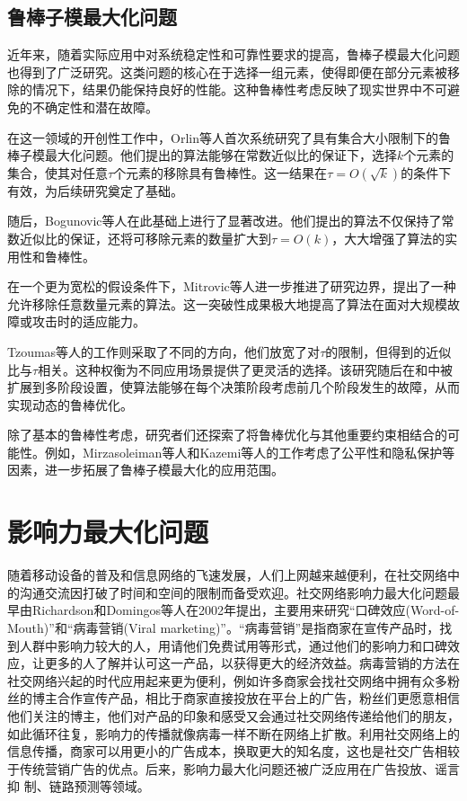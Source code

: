 \subsection{鲁棒子模最大化问题}

近年来，随着实际应用中对系统稳定性和可靠性要求的提高，鲁棒子模最大化问题也得到了广泛研究。这类问题的核心在于选择一组元素，使得即便在部分元素被移除的情况下，结果仍能保持良好的性能。这种鲁棒性考虑反映了现实世界中不可避免的不确定性和潜在故障。

在这一领域的开创性工作中，Orlin等人\cite{orlin2018robust}首次系统研究了具有集合大小限制下的鲁棒子模最大化问题。他们提出的算法能够在常数近似比的保证下，选择$k$个元素的集合，使其对任意$\tau$个元素的移除具有鲁棒性。这一结果在$\tau = O(\sqrt{k})$的条件下有效，为后续研究奠定了基础。

随后，Bogunovic等人\cite{bogunovic2017robust}在此基础上进行了显著改进。他们提出的算法不仅保持了常数近似比的保证，还将可移除元素的数量扩大到$\tau = O(k)$，大大增强了算法的实用性和鲁棒性。

在一个更为宽松的假设条件下，Mitrovic等人\cite{mitrovic2017streaming}进一步推进了研究边界，提出了一种允许移除任意数量元素的算法。这一突破性成果极大地提高了算法在面对大规模故障或攻击时的适应能力。

Tzoumas等人的工作\cite{tzoumas2017resilient}则采取了不同的方向，他们放宽了对$\tau$的限制，但得到的近似比与$\tau$相关。这种权衡为不同应用场景提供了更灵活的选择。该研究随后在\cite{tzoumas2018resilient}和\cite{tzoumas2020robust}中被扩展到多阶段设置，使算法能够在每个决策阶段考虑前几个阶段发生的故障，从而实现动态的鲁棒优化。

除了基本的鲁棒性考虑，研究者们还探索了将鲁棒优化与其他重要约束相结合的可能性。例如，Mirzasoleiman等人\cite{mirzasoleiman2017deletion}和Kazemi等人\cite{kazemi2018scalable}的工作考虑了公平性和隐私保护等因素，进一步拓展了鲁棒子模最大化的应用范围。


\section{影响力最大化问题}
\label{sec:2_3}

随着移动设备的普及和信息网络的飞速发展，人们上网越来越便利，在社交网络中的沟通交流因打破了时间和空间的限制而备受欢迎。社交网络影响力最大化问题最早由Richardson和Domingos等人\cite{richardson2002mining}在2002年提出，主要用来研究“口碑效应(Word-of-Mouth)”和“病毒营销(Viral marketing)”。“病毒营销”是指商家在宣传产品时，找到人群中影响力较大的人，用请他们免费试用等形式，通过他们的影响力和口碑效应，让更多的人了解并认可这一产品，以获得更大的经济效益。病毒营销的方法在社交网络兴起的时代应用起来更为便利，例如许多商家会找社交网络中拥有众多粉丝的博主合作宣传产品，相比于商家直接投放在平台上的广告，粉丝们更愿意相信他们关注的博主，他们对产品的印象和感受又会通过社交网络传递给他们的朋友，如此循环往复，影响力的传播就像病毒一样不断在网络上扩散。利用社交网络上的信息传播，商家可以用更小的广告成本，换取更大的知名度，这也是社交广告相较于传统营销广告的优点。后来，影响力最大化问题还被广泛应用在广告投放\cite{zhang2020geodemographic,zeng2021business,saleem2019effective}、谣言抑
制\cite{shi2019adaptive,zhong2023rumor,myilsamy2024optimal}、链路预测\cite{tripathi2022network,daud2020applications}等领域。


